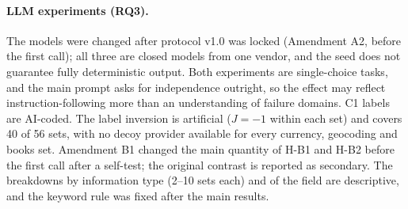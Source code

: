 \paragraph{LLM experiments (RQ3).} The models were changed after protocol v1.0 was locked (Amendment A2, before the first call); all three are closed models from one vendor, and the seed does not guarantee fully deterministic output. Both experiments are single-choice tasks, and the main prompt asks for independence outright, so the effect may reflect instruction-following more than an understanding of failure domains. C1 labels are AI-coded. The label inversion is artificial ($J=-1$ within each set) and covers 40 of 56 sets, with no decoy provider available for every currency, geocoding and books set. Amendment B1 changed the main quantity of H-B1 and H-B2 before the first call after a self-test; the original contrast is reported as secondary. The breakdowns by information type (2--10 sets each) and of the  field are descriptive, and the keyword rule was fixed after the main results.
